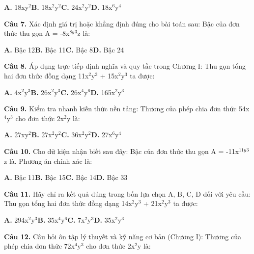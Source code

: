 \documentclass[11pt,a4paper]{article}
\begin{document}
\hspace*{1.5em}\textbf{A.} 18xy$^2$\quad\quad \textbf{B.} 18x$^2$y$^2$\quad\quad \textbf{C.} 24x$^2$y$^2$\quad\quad \textbf{D.} 18x$^6$y$^4$\par\vspace{2pt}
\textbf{\color{primary} Câu 7.} Xác định giá trị hoặc khẳng định đúng cho bài toán sau: Bậc của đơn thức thu gọn A = -8x$^{8y}$$^3$z là:\par
\hspace*{1.5em}\textbf{A.} Bậc 12\quad\quad \textbf{B.} Bậc 11\quad\quad \textbf{C.} Bậc 8\quad\quad \textbf{D.} Bậc 24\par\vspace{2pt}
\textbf{\color{primary} Câu 8.} Áp dụng trực tiếp định nghĩa và quy tắc trong Chương I: Thu gọn tổng hai đơn thức đồng dạng 11x$^2$y$^3$ + 15x$^2$y$^3$ ta được:\par
\hspace*{1.5em}\textbf{A.} 4x$^2$y$^3$\quad\quad \textbf{B.} 26x$^2$y$^3$\quad\quad \textbf{C.} 26x$^4$y$^6$\quad\quad \textbf{D.} 165x$^2$y$^3$\par\vspace{2pt}
\textbf{\color{primary} Câu 9.} Kiểm tra nhanh kiến thức nền tảng: Thương của phép chia đơn thức 54x$^4$y$^3$ cho đơn thức 2x$^2$y là:\par
\hspace*{1.5em}\textbf{A.} 27xy$^2$\quad\quad \textbf{B.} 27x$^2$y$^2$\quad\quad \textbf{C.} 36x$^2$y$^2$\quad\quad \textbf{D.} 27x$^6$y$^4$\par\vspace{2pt}
\textbf{\color{primary} Câu 10.} Cho dữ kiện nhận biết sau đây: Bậc của đơn thức thu gọn A = -11x$^{11y}$$^3$z là. Phương án chính xác là:\par
\hspace*{1.5em}\textbf{A.} Bậc 11\quad\quad \textbf{B.} Bậc 15\quad\quad \textbf{C.} Bậc 14\quad\quad \textbf{D.} Bậc 33\par\vspace{2pt}
\textbf{\color{primary} Câu 11.} Hãy chỉ ra kết quả đúng trong bốn lựa chọn A, B, C, D đối với yêu cầu: Thu gọn tổng hai đơn thức đồng dạng 14x$^2$y$^3$ + 21x$^2$y$^3$ ta được:\par
\hspace*{1.5em}\textbf{A.} 294x$^2$y$^3$\quad\quad \textbf{B.} 35x$^4$y$^6$\quad\quad \textbf{C.} 7x$^2$y$^3$\quad\quad \textbf{D.} 35x$^2$y$^3$\par\vspace{2pt}
\textbf{\color{primary} Câu 12.} Câu hỏi ôn tập lý thuyết và kỹ năng cơ bản (Chương I): Thương của phép chia đơn thức 72x$^4$y$^3$ cho đơn thức 2x$^2$y là:\par
\end{document}
